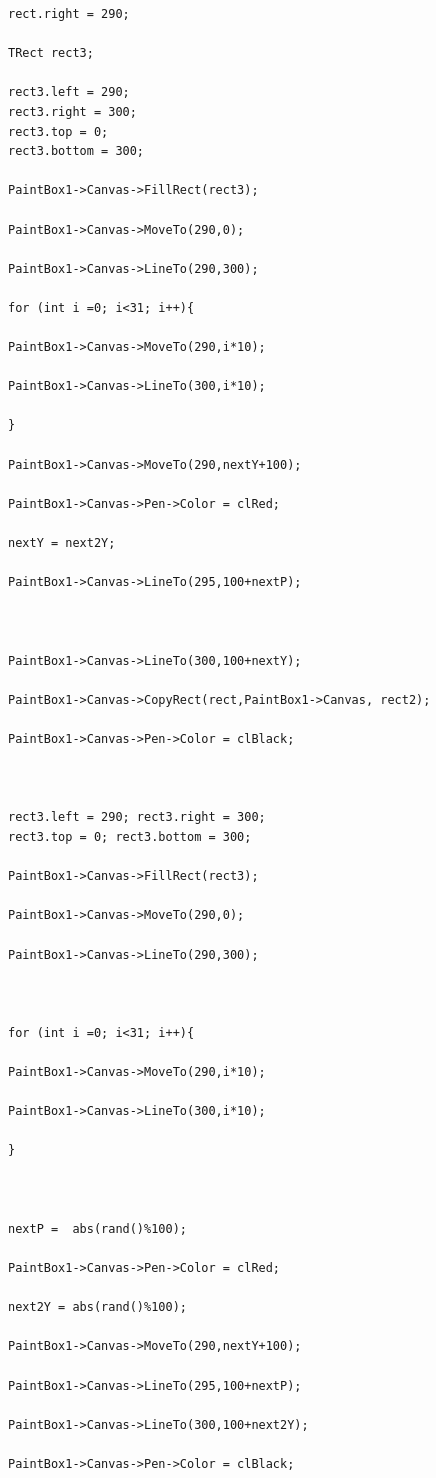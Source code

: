 \documentclass[12pt]{article}
\begin{document}
\begin{lstlisting}
rect.right = 290;

TRect rect3;

rect3.left = 290; 
rect3.right = 300; 
rect3.top = 0; 
rect3.bottom = 300;

PaintBox1->Canvas->FillRect(rect3);

PaintBox1->Canvas->MoveTo(290,0);

PaintBox1->Canvas->LineTo(290,300);

for (int i =0; i<31; i++){

PaintBox1->Canvas->MoveTo(290,i*10);

PaintBox1->Canvas->LineTo(300,i*10);

}

PaintBox1->Canvas->MoveTo(290,nextY+100);

PaintBox1->Canvas->Pen->Color = clRed;

nextY = next2Y;

PaintBox1->Canvas->LineTo(295,100+nextP);



PaintBox1->Canvas->LineTo(300,100+nextY);

PaintBox1->Canvas->CopyRect(rect,PaintBox1->Canvas, rect2);

PaintBox1->Canvas->Pen->Color = clBlack;



rect3.left = 290; rect3.right = 300; 
rect3.top = 0; rect3.bottom = 300;

PaintBox1->Canvas->FillRect(rect3);

PaintBox1->Canvas->MoveTo(290,0);

PaintBox1->Canvas->LineTo(290,300);



for (int i =0; i<31; i++){

PaintBox1->Canvas->MoveTo(290,i*10);

PaintBox1->Canvas->LineTo(300,i*10);

}



nextP =  abs(rand()%100);

PaintBox1->Canvas->Pen->Color = clRed;

next2Y = abs(rand()%100);

PaintBox1->Canvas->MoveTo(290,nextY+100);

PaintBox1->Canvas->LineTo(295,100+nextP);

PaintBox1->Canvas->LineTo(300,100+next2Y);

PaintBox1->Canvas->Pen->Color = clBlack;


\end{lstlisting}
\end{document}

